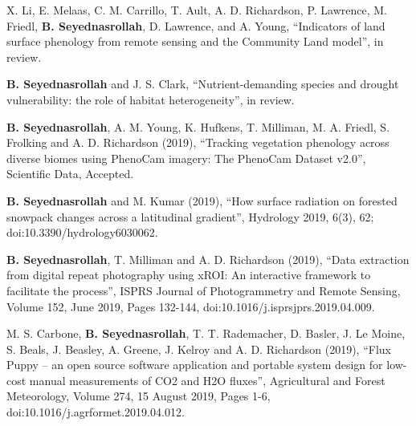\documentclass[10pt]{article}
\newenvironment{changemargin}[2]{%
  \begin{list}{}{%
 \setlength{\topsep}{0pt}%
 \setlength{\leftmargin}{#1}%
 \setlength{\rightmargin}{#2}%
 \setlength{\listparindent}{\parindent}%
 \setlength{\itemindent}{\parindent}%
 \setlength{\parsep}{\parskip}%
  }%
  \item[]}{\end{list}
}
\newenvironment{body} {
  \vspace*{-2pt}
  \begin{changemargin}{-0.5in}{-0.5in}
}
{\end{changemargin}
}
\begin{document}
\begin{body}
  \begin{etaremune}


    \item X. Li, E. Melaas, C. M. Carrillo, T. Ault, A. D. Richardson, P. Lawrence, M. Friedl, \textbf{B. Seyednasrollah}, D. Lawrence, and A. Young, ``Indicators of land surface phenology from remote sensing and the Community Land model'', in review.\\
    \medskip
    
    \item \textbf{B. Seyednasrollah} and J. S. Clark, ``Nutrient-demanding species and drought vulnerability: the role of habitat heterogeneity'', in review.\\
    \medskip
  
    \item  \textbf{B. Seyednasrollah}, A. M. Young, K. Hufkens, T. Milliman, M. A. Friedl, S. Frolking and A. D. Richardson (2019), ``Tracking vegetation phenology across diverse biomes using PhenoCam imagery: The PhenoCam Dataset v2.0'', Scientific Data, Accepted.\\
    \medskip

        \item  \textbf{B. Seyednasrollah} and M. Kumar (2019), ``How surface radiation on forested snowpack changes across a latitudinal gradient'', Hydrology 2019, 6(3), 62; doi:10.3390/hydrology6030062.    \\
    \medskip

    \item \textbf{B. Seyednasrollah}, T. Milliman and A. D. Richardson (2019), ``Data extraction from digital repeat photography using xROI: An interactive framework to facilitate the process'', ISPRS Journal of Photogrammetry and Remote Sensing, Volume 152, June 2019, Pages 132-144, doi:10.1016/j.isprsjprs.2019.04.009.\\
    \medskip

    \item M. S. Carbone, \textbf{B. Seyednasrollah}, T. T. Rademacher, D. Basler, J. Le Moine, S. Beals, J. Beasley, A. Greene, J. Kelroy and A. D. Richardson (2019), ``Flux Puppy – an open source software application and portable system design for low-cost manual measurements of CO2 and H2O fluxes'', Agricultural and Forest Meteorology, Volume 274, 15 August 2019, Pages 1-6, doi:10.1016/j.agrformet.2019.04.012.\\
    \medskip



\end{etaremune}
\end{body}
\end{document}
